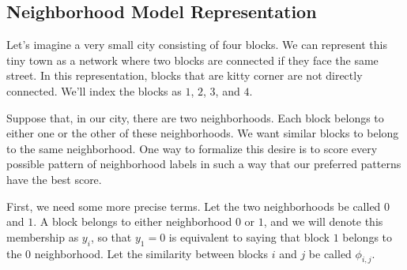 \subsection{Neighborhood Model Representation}
Let's imagine a very small city consisting of four blocks. We can
represent this tiny town as a network where two blocks are connected
if they face the same street. In this representation, blocks that are
kitty corner are not directly connected. We'll index the blocks as
$1$, $2$, $3$, and $4$.

\begin{figure}[h]
\centering
{}
\end{figure}

\begin{figure}[h]
\centering


\end{figure}

Suppose that, in our city, there are two neighborhoods. Each block
belongs to either one or the other of these neighborhoods. We want
similar blocks to belong to the same neighborhood. One way to
formalize this desire is to score every possible pattern of
neighborhood labels in such a way that our preferred patterns have the
best score.

First, we need some more precise terms. Let the two neighborhoods be
called $0$ and $1$. A block belongs to either neighborhood $0$ or
$1$, and we will denote this membership as $y_i$, so that $y_1=0$ is
equivalent to saying that block $1$ belongs to the $0$
neighborhood. Let the similarity between blocks $i$ and $j$ be called
$\phi_{i,j}$.

\begin{figure}[!h]
\centering


\end{figure}


